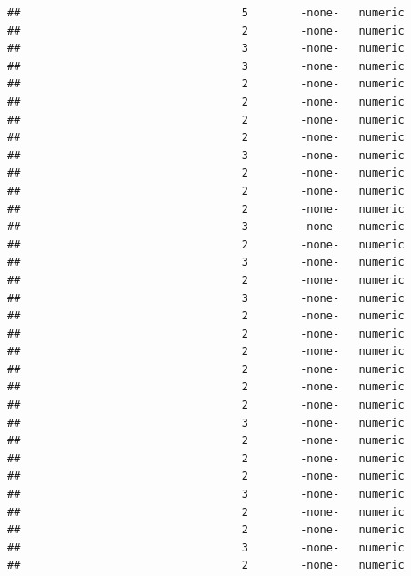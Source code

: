 \documentclass[
  12pt,
]{article}
\begin{document}
\begin{verbatim}
##                                  5        -none-   numeric                    
##                                  2        -none-   numeric                    
##                                  3        -none-   numeric                    
##                                  3        -none-   numeric                    
##                                  2        -none-   numeric                    
##                                  2        -none-   numeric                    
##                                  2        -none-   numeric                    
##                                  2        -none-   numeric                    
##                                  3        -none-   numeric                    
##                                  2        -none-   numeric                    
##                                  2        -none-   numeric                    
##                                  2        -none-   numeric                    
##                                  3        -none-   numeric                    
##                                  2        -none-   numeric                    
##                                  3        -none-   numeric                    
##                                  2        -none-   numeric                    
##                                  3        -none-   numeric                    
##                                  2        -none-   numeric                    
##                                  2        -none-   numeric                    
##                                  2        -none-   numeric                    
##                                  2        -none-   numeric                    
##                                  2        -none-   numeric                    
##                                  2        -none-   numeric                    
##                                  3        -none-   numeric                    
##                                  2        -none-   numeric                    
##                                  2        -none-   numeric                    
##                                  2        -none-   numeric                    
##                                  3        -none-   numeric                    
##                                  2        -none-   numeric                    
##                                  2        -none-   numeric                    
##                                  3        -none-   numeric                    
##                                  2        -none-   numeric                    

\end{verbatim}
\end{document}
